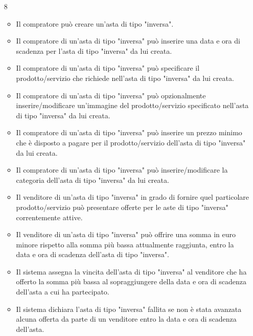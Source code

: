 \begin{itemize}
\begin{itemize}
                \end{itemize}
            \item[8]
                \begin{itemize}            
                    \item Il compratore può creare un'asta di tipo "inversa".
                    \item Il compratore di un'asta di tipo "inversa" può inserire una data e ora di scadenza per l'asta di tipo "inversa" da lui creata.
                    \item Il compratore di un'asta di tipo "inversa" può specificare il prodotto/servizio che richiede nell'asta di tipo "inversa" da lui creata.
                    \item Il compratore di un'asta di tipo "inversa" può opzionalmente inserire/modificare un'immagine del prodotto/servizio specificato nell'asta di tipo "inversa" da lui creata.
                    \item Il compratore di un'asta di tipo "inversa" può inserire un prezzo minimo che è disposto a pagare per il prodotto/servizio dell'asta di tipo "inversa" da lui creata.
                    \item Il compratore di un'asta di tipo "inversa" può inserire/modificare la categoria dell'asta di tipo "inversa" da lui creata.
                    \item Il venditore di un'asta di tipo "inversa" in grado di fornire quel particolare prodotto/servizio può presentare offerte per le aste di tipo "inversa" correntemente attive.
                    \item Il venditore di un'asta di tipo "inversa" può offrire una somma in euro minore rispetto alla somma più bassa attualmente raggiunta, entro la data e ora di scadenza dell'asta di tipo "inversa".
                    \item Il sistema assegna la vincita dell'asta di tipo "inversa" al venditore che ha offerto la somma più bassa al sopraggiungere della data e ora di scadenza dell'asta a cui ha partecipato.
                    \item Il sistema dichiara l'asta di tipo "inversa" fallita se non è stata avanzata alcuna offerta da parte di un venditore entro la data e ora di scadenza dell'asta.
                \end{itemize}
        \end{itemize}
